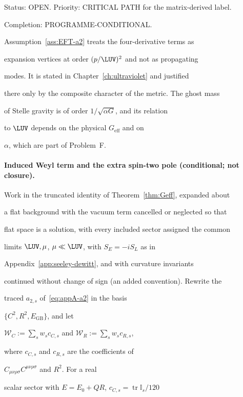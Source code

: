 Status: OPEN. Priority: CRITICAL PATH for the matrix-derived label.

Completion: PROGRAMME-CONDITIONAL.



Assumption~\ref{ass:EFT-a2} treats the four-derivative terms as

expansion vertices at order \((p/\LUV)^2\) and not as propagating

modes. It is stated in Chapter~\ref{ch:ultraviolet} and justified

there only by the composite character of the metric. The ghost mass

of Stelle gravity is of order \(1/\sqrt{\alpha G}\), and its relation

to \(\LUV\) depends on the physical \(G_{\mathrm{eff}}\) and on

\(\alpha\), which are part of Problem~F.





\paragraph{Induced Weyl term and the extra spin-two pole (conditional; not closure).} \label{detail:sec-N-paragraphinducedweyltermandthe-46}

Work in the truncated identity of Theorem~\ref{thm:Geff}, expanded about

a flat background with the vacuum term cancelled or neglected so that

flat space is a solution, with every included sector assigned the common

limits \(\LUV,\mu\), \(\mu\ll\LUV\), with \(S_E=-iS_L\) as in

Appendix~\ref{app:seeley-dewitt}, and with curvature invariants

continued without change of sign (an added convention). Rewrite the

traced \(a_{2,s}\) of~\eqref{eq:appA-a2} in the basis

\(\{C^2,R^2,E_{\mathrm{GB}}\}\), and let

\(\mathcal W_C:=\sum_sw_sc_{C,s}\) and \(\mathcal W_R:=\sum_sw_sc_{R,s}\),

where \(c_{C,s}\) and \(c_{R,s}\) are the coefficients of

\(C_{\mu\nu\rho\sigma}C^{\mu\nu\rho\sigma}\) and \(R^2\). For a real

scalar sector with \(E=E_0+QR\), \(c_{C,s}=\operatorname{tr}\mathbb I_s/120\)

